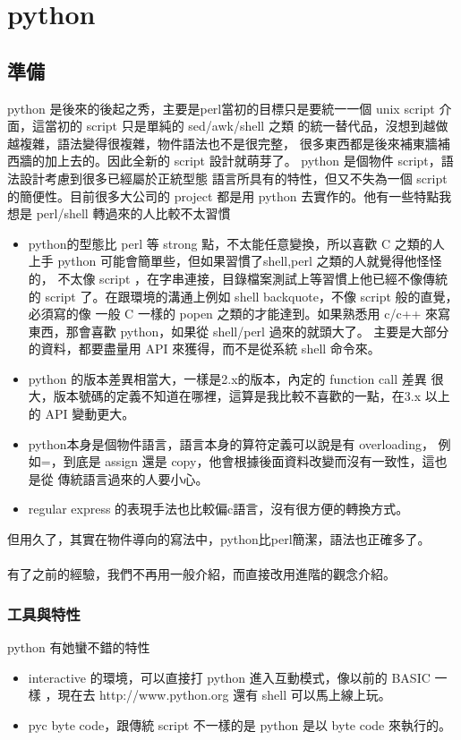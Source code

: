 \chapter{python}
\section{準備}
python 是後來的後起之秀，主要是perl當初的目標只是要統一一個
unix script 介面，這當初的 script 只是單純的 sed/awk/shell 之類
的統一替代品，沒想到越做越複雜，語法變得很複雜，物件語法也不是很完整，
很多東西都是後來補東牆補西牆的加上去的。因此全新的 script 設計就萌芽了。
python 是個物件 script，語法設計考慮到很多已經屬於正統型態
語言所具有的特性，但又不失為一個 script 的簡便性。目前很多大公司的 project
都是用 python 去實作的。他有一些特點我想是 perl/shell 轉過來的人比較不太習慣
\begin{itemize}
  \item python的型態比 perl 等 strong 點，不太能任意變換，所以喜歡 C 之類的人
    上手 python 可能會簡單些，但如果習慣了shell,perl 之類的人就覺得他怪怪的，
    不太像 script ，在字串連接，目錄檔案測試上等習慣上他已經不像傳統的 script
    了。在跟環境的溝通上例如 shell backquote，不像 script 般的直覺，必須寫的像
    一般 C 一樣的 popen 之類的才能達到。如果熟悉用 c/c++ 來寫東西，那會喜歡
    python，如果從 shell/perl 過來的就頭大了。 主要是大部分的資料，都要盡量用 
    API 來獲得，而不是從系統 shell 命令來。
  \item python 的版本差異相當大，一樣是2.x的版本，內定的 function call 差異
    很大，版本號碼的定義不知道在哪裡，這算是我比較不喜歡的一點，在3.x
    以上的 API 變動更大。
  \item python本身是個物件語言，語言本身的算符定義可以說是有 overloading，
    例如=，到底是 assign 還是 copy，他會根據後面資料改變而沒有一致性，這也是從
    傳統語言過來的人要小心。
  \item regular express 的表現手法也比較偏c語言，沒有很方便的轉換方式。
\end{itemize}
但用久了，其實在物件導向的寫法中，python比perl簡潔，語法也正確多了。
\\\\
有了之前的經驗，我們不再用一般介紹，而直接改用進階的觀念介紹。
\subsection{工具與特性}
python 有她蠻不錯的特性
\begin{itemize}
  \item interactive 的環境，可以直接打 python 進入互動模式，像以前的 BASIC 一樣
    ，現在去 http://www.python.org 還有 shell 可以馬上線上玩。
  \item pyc byte code，跟傳統 script 不一樣的是 python 是以 byte code 來執行的。
\end{itemize}

